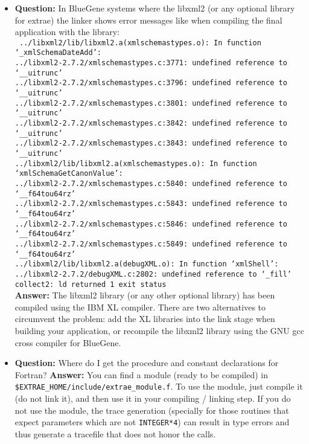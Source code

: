 \begin{itemize}
\item {\bf Question:} In BlueGene systems where the libxml2 (or any optional library for extrae) the linker shows error messages like when compiling the final application with the \TRACE library:\\
			{\tt
			../libxml2/lib/libxml2.a(xmlschemastypes.o): In function `\_xmlSchemaDateAdd':\\
			../libxml2-2.7.2/xmlschemastypes.c:3771: undefined reference to `\_\_uitrunc'\\
			../libxml2-2.7.2/xmlschemastypes.c:3796: undefined reference to `\_\_uitrunc'\\
			../libxml2-2.7.2/xmlschemastypes.c:3801: undefined reference to `\_\_uitrunc'\\
			../libxml2-2.7.2/xmlschemastypes.c:3842: undefined reference to `\_\_uitrunc'\\
			../libxml2-2.7.2/xmlschemastypes.c:3843: undefined reference to `\_\_uitrunc'\\
			../libxml2/lib/libxml2.a(xmlschemastypes.o): In function `xmlSchemaGetCanonValue':\\
			../libxml2-2.7.2/xmlschemastypes.c:5840: undefined reference to `\_\_f64tou64rz'\\
			../libxml2-2.7.2/xmlschemastypes.c:5843: undefined reference to `\_\_f64tou64rz'\\
			../libxml2-2.7.2/xmlschemastypes.c:5846: undefined reference to `\_\_f64tou64rz'\\
			../libxml2-2.7.2/xmlschemastypes.c:5849: undefined reference to `\_\_f64tou64rz'\\
			../libxml2/lib/libxml2.a(debugXML.o): In function `xmlShell':\\
			../libxml2-2.7.2/debugXML.c:2802: undefined reference to `\_fill'\\
			collect2: ld returned 1 exit status\\
			}
			{\bf Answer:  } The libxml2 library (or any other optional library) has been compiled using the IBM XL compiler. There are two alternatives to circumvent the problem: add the XL libraries into the link stage when building your application, or recompile the libxml2 library using the GNU gcc cross compiler for BlueGene.

\item {\bf Question:} Where do I get the procedure and constant declarations for Fortran?
      {\bf Answer:  } You can find a module (ready to be compiled) in {\tt \${EXTRAE\_HOME}/include/extrae\_module.f}. To use the module, just compile it (do not link it), and then use it in your compiling / linking step. If you do not use the module, the trace generation (specially for those routines that expect parameters which are not {\tt INTEGER*4}) can result in type errors and thus generate a tracefile that does not honor the \TRACE calls.

\end{itemize}

